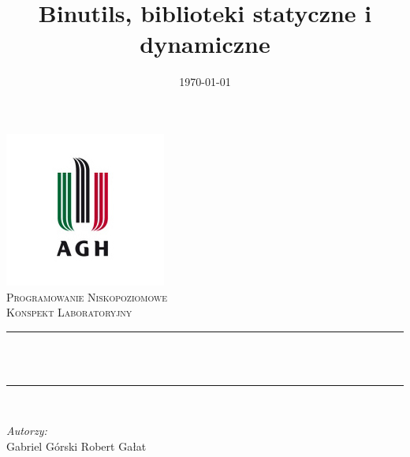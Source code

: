 \documentclass[12pt]{article}
\title{Binutils, biblioteki statyczne i dynamiczne}								%
\author{}								%
\date{\today}											%
\makeatletter
\let\thetitle\@title
\let\thedate\@date
\makeatother
\begin{document}

\begin{titlepage}
	\centering
    \vspace*{0.5 cm}
    \includegraphics[scale = 0.75]{agh.jpg}\\[1.0 cm]	%
	\textsc{\Large Programowanie Niskopoziomowe}\\[0.5 cm]				%
	\textsc{\large Konspekt Laboratoryjny}\\[0.5 cm]				%
	\rule{\linewidth}{0.2 mm} \\[0.4 cm]
	{ \huge \bfseries \thetitle}\\
	\rule{\linewidth}{0.2 mm} \\[1.5 cm]
	
	\begin{minipage}{0.4\textwidth}
		\begin{flushleft} \large
      \vspace{3cm}
			\emph{Autorzy:}\\
			Gabriel Górski\newline
			Robert Gałat						%
			\end{flushleft}
			\end{minipage}~
			\begin{minipage}{0.4\textwidth}
			\begin{flushright} \large
		\end{flushright}
	\end{minipage}\\[2 cm]
	
	{\large \thedate}\\[2 cm]
 
	\vfill
	
\end{titlepage}
\end{document}
